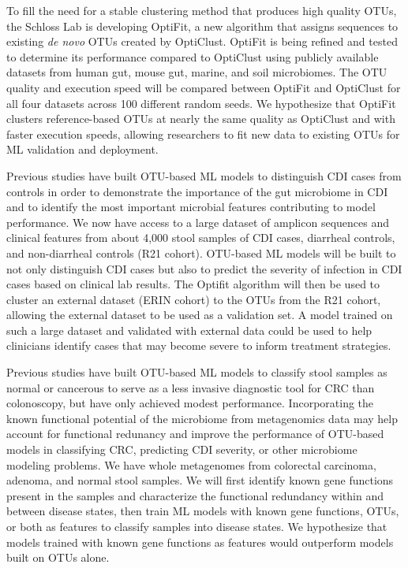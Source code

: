 \documentclass[11pt]{article}
\begin{document}
To fill the need for a stable clustering method that produces high quality OTUs, 
the Schloss Lab is developing OptiFit, a new algorithm that assigns sequences to 
existing \textit{de novo} OTUs created by OptiClust.
OptiFit is being refined and tested to determine its performance compared to
OptiClust using publicly available datasets 
from human gut, mouse gut, marine, and soil microbiomes.
The OTU quality and execution speed will be compared between OptiFit and OptiClust 
for all four datasets across 100 different random seeds.
We hypothesize that OptiFit clusters reference-based OTUs at nearly the same 
quality as OptiClust and with faster execution speeds, allowing researchers to 
fit new data to existing OTUs for ML validation and deployment.

Previous studies have built OTU-based ML models to distinguish CDI
cases from controls in order to demonstrate the importance of the gut microbiome
in CDI and to identify the most important microbial features contributing to
model performance.
We now have access to a large dataset of amplicon sequences and
clinical features from about 4,000 stool samples of CDI cases, diarrheal
controls, and non-diarrheal controls (R21 cohort).
OTU-based ML models will be built to not only distinguish CDI cases but also to
predict the severity of infection in CDI cases based on clinical lab results.
The Optifit algorithm will then be used to cluster an external dataset (ERIN 
cohort) to the OTUs from the R21 cohort, allowing the 
external dataset to be used as a validation set.
A model trained on such a large dataset and validated with external data could 
be used to help clinicians identify cases that may become severe to inform 
treatment strategies.

Previous studies have built OTU-based ML models to classify stool
samples as normal or cancerous to serve as a less invasive diagnostic tool for
CRC than colonoscopy, but have only achieved modest performance.
Incorporating the known functional potential of the microbiome from metagenomics
data may help account for functional redunancy and improve the performance of
OTU-based models in classifying CRC, predicting CDI severity, or other 
microbiome modeling problems.
We have whole metagenomes from colorectal carcinoma, adenoma, and normal stool samples.
We will first identify known gene functions present in the samples and 
characterize the functional redundancy within and between disease states,
then train ML models with known gene functions, OTUs, or both as features to 
classify samples into disease states.
We hypothesize that models trained with known gene functions as features 
would outperform models built on OTUs alone.
\end{document}
